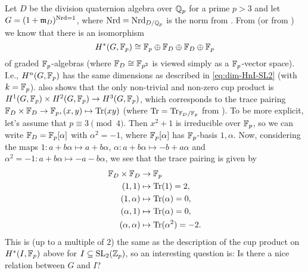 \begin{remark}\label{rem:quaternion}
  Let $D$ be the division quaternion algebra over $\mathbb{Q}_{p}$ for a prime $p>3$ and let $G = (1+\mathfrak{m}_{D})^{\operatorname{Nrd} = 1}$, where $\operatorname{Nrd} = \operatorname{Nrd}_{D/\mathbb{Q}_{p}}$ is the norm from \cite[Def.~2.5]{Neukirch}. From \cite[Sect.~6.3]{Sor} (or from \cite[Prop.~7]{Henn}) we know that there is an isomorphism
  \begin{equation*}
    H^{*}(G,\mathbb{F}_{p}) \cong \mathbb{F}_{p} \oplus \mathbb{F}_{D} \oplus \mathbb{F}_{D} \oplus \mathbb{F}_{p}
  \end{equation*}
  of graded $\mathbb{F}_{p}$-algebras (where $\mathbb{F}_{D} \cong \mathbb{F}_{p^{2}}$ is viewed simply as a $\mathbb{F}_{p}$-vector space). I.e., $H^{n}(G,\mathbb{F}_{p})$ has the same dimensions as described in \eqref{eq:dim-HnI-SL2} (with $k=\mathbb{F}_{p}$). \cite{Sor} also shows that the only non-trivial and non-zero cup product is $H^{1}(G,\mathbb{F}_{p}) \times H^{2}(G,\mathbb{F}_{p}) \to H^{3}(G,\mathbb{F}_{p})$, which corresponds to the trace pairing $\mathbb{F}_{D} \times \mathbb{F}_{D} \to \mathbb{F}_{p}, (x,y) \mapsto \operatorname{Tr}(xy)$ (where $\operatorname{Tr} = \operatorname{Tr}_{\mathbb{F}_{D}/\mathbb{F}_{p}}$ from \cite[Def.~2.5]{Neukirch}). To be more explicit, let's assume that $p \equiv 3 \pmod{4}$. Then $x^{2}+1$ is irreducible over $\mathbb{F}_{p}$, so we can write $\mathbb{F}_{D} = \mathbb{F}_{p}[\alpha]$ with $\alpha^{2} = -1$, where $\mathbb{F}_{p}[\alpha]$ has $\mathbb{F}_{p}$-basis $1,\alpha$. Now, considering the maps $1\colon a+b\alpha \mapsto a+b\alpha$, $\alpha\colon a+b\alpha \mapsto -b + a\alpha$ and $\alpha^{2}=-1 \colon a+b\alpha \mapsto -a-b\alpha$, we see that the trace pairing is given by
  \begin{align*}
    \mathbb{F}_{D} \times \mathbb{F}_{D} &\to \mathbb{F}_{p} \\
    (1,1) &\mapsto \operatorname{Tr}(1) = 2, \\
    (1,\alpha) &\mapsto \operatorname{Tr}(\alpha) = 0, \\
    (\alpha,1) &\mapsto \operatorname{Tr}(\alpha) = 0, \\
    (\alpha,\alpha) &\mapsto \operatorname{Tr}(\alpha^{2}) = -2.
  \end{align*}
  This is (up to a multiple of $2$) the same as the description of the cup product on $H^{*}(I,\mathbb{F}_{p})$ above for $I \subseteq \operatorname{SL}_{2}(\mathbb{Z}_{p})$, so an interesting question is: Is there a nice relation between $G$ and $I$?


\end{remark}
